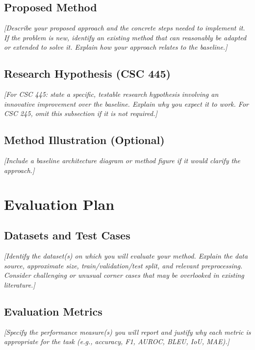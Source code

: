\documentclass[11pt]{article}
\newcommand{\prompt}[1]{\textcolor{promptgray}{\textit{[#1]}}}
\begin{document}
\subsection{Proposed Method}
\prompt{Describe your proposed approach and the concrete steps needed to
implement it. If the problem is new, identify an existing method that can
reasonably be adapted or extended to solve it. Explain how your approach
relates to the baseline.}

\subsection{Research Hypothesis (CSC 445)}
\prompt{For CSC 445: state a specific, testable research hypothesis involving
an innovative improvement over the baseline. Explain why you expect it to
work. For CSC 245, omit this subsection if it is not required.}

\subsection{Method Illustration (Optional)}
\prompt{Include a baseline architecture diagram or method figure if it
would clarify the approach.}


\section{Evaluation Plan}

\subsection{Datasets and Test Cases}
\prompt{Identify the dataset(s) on which you will evaluate your method.
Explain the data source, approximate size, train/validation/test split,
and relevant preprocessing. Consider challenging or unusual corner cases
that may be overlooked in existing literature.}

\subsection{Evaluation Metrics}
\prompt{Specify the performance measure(s) you will report and justify
why each metric is appropriate for the task (e.g., accuracy, F1, AUROC,
BLEU, IoU, MAE).}
\end{document}
